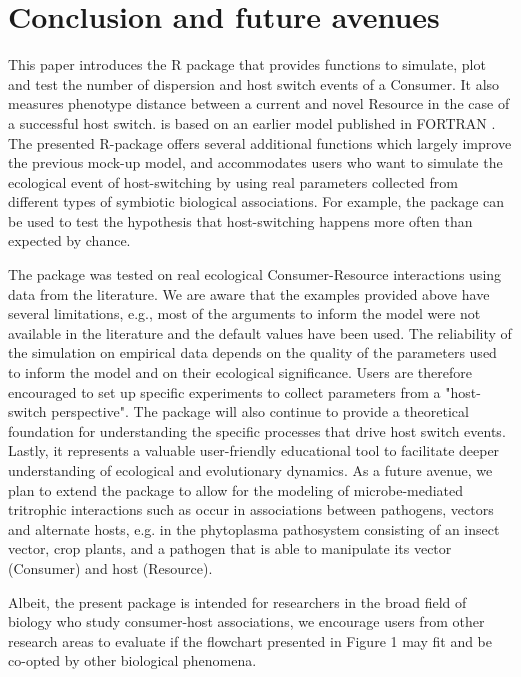 \section{Conclusion and future avenues}

This paper introduces the R package  that provides functions to simulate, plot and test the number of dispersion and host switch events of a Consumer. It also measures phenotype distance between a current and novel Resource in the case of a successful host switch.  is based on an earlier model published in FORTRAN \citep{araujo_understanding_2015}. The presented R-package offers several additional functions which largely improve the previous mock-up model, and
accommodates users who want to simulate the ecological event of host-switching by using real parameters collected from different types of symbiotic biological associations.
For example, the  package can be used to test the hypothesis that host-switching happens more often than expected by chance. 

The  package was tested on real ecological Consumer-Resource interactions using data from the literature. We are aware that the examples provided above have several limitations, e.g., most of the arguments to inform the model were not available in the literature and the default values have been used. The reliability of the simulation on empirical data depends on the quality of the parameters used to inform the model and on their ecological significance. Users are therefore encouraged to set up specific experiments to collect parameters from a "host-switch perspective". 
The  package will also continue to provide a theoretical foundation for understanding the specific processes that drive host switch events.
Lastly, it represents a valuable user-friendly educational tool to facilitate deeper understanding of ecological and evolutionary dynamics.
As a future avenue, we plan to extend the package to allow for the modeling of microbe-mediated tritrophic interactions such as occur in associations between pathogens, vectors and alternate hosts, e.g. in the phytoplasma pathosystem consisting of an insect vector, crop plants, and a pathogen that is able to manipulate its vector (Consumer) and host (Resource).

Albeit, the present package is intended for researchers in the broad field of biology who study consumer-host associations, we encourage users from other research areas to evaluate if the flowchart presented in Figure 1 may fit and be co-opted by other biological phenomena.

